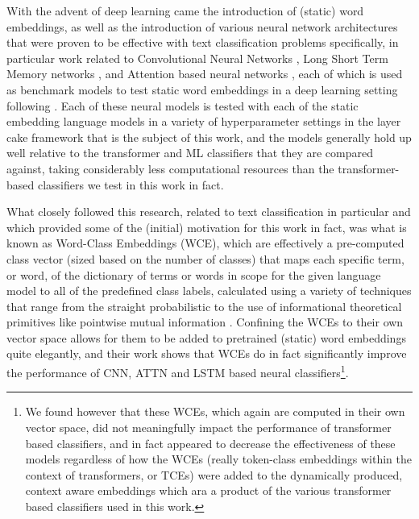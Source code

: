 \documentclass[final]{clv2025}
\begin{document}
With the advent of deep learning came the introduction of (static) word embeddings, as well as the introduction of various neural network architectures that were proven to be effective with text classification problems specifically, in particular work related to Convolutional Neural Networks \cite{yoon2014convolutional} \cite{zhang2015character}, Long Short Term Memory networks \cite{zang2021research}, and Attention based neural networks \cite{liuguo2019bidirectional}, each of which is used as benchmark models to test static word embeddings in a deep learning setting following \cite{moreo}. Each of these neural models is tested with each of the static embedding language models in a variety of hyperparameter settings in the layer cake framework that is the subject of this work, and the models generally hold up well relative to the transformer and ML classifiers that they are compared against, taking considerably less computational resources than the transformer-based classifiers we test in this work in fact.

What closely followed this research, related to text classification in particular and which provided some of the (initial) motivation for this work in fact, was what is known as Word-Class Embeddings (WCE), which are effectively a pre-computed class vector (sized based on the number of classes) that maps each specific term, or word, of the dictionary of terms or words in scope for the given language model to all of the predefined class labels, calculated using a variety of techniques that range from the straight probabilistic to the use of informational theoretical primitives like pointwise mutual information \cite{moreo}. Confining the WCEs to their own vector space allows for them to be added to pretrained (static) word embeddings quite elegantly, and their work shows that WCEs do in fact significantly improve the performance of CNN, ATTN and LSTM based neural classifiers\footnote{We found however that these WCEs, which again are computed in their own vector space, did not meaningfully impact the performance of transformer based classifiers, and in fact appeared to decrease the effectiveness of these models regardless of how the WCEs (really token-class embeddings within the context of transformers, or TCEs) were added to the dynamically produced, context aware embeddings which ara a product of the various transformer based classifiers used in this work.}.  
\end{document}
